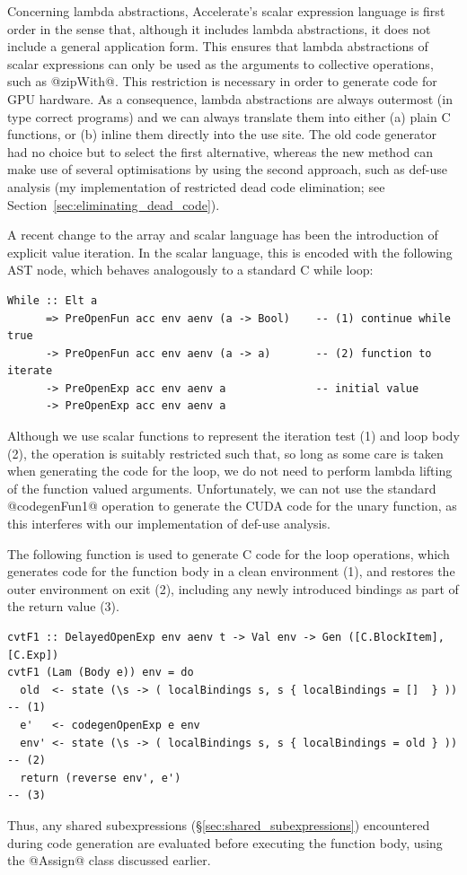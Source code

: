 Concerning lambda abstractions, Accelerate's scalar
expression language is first order in the sense that, although it includes
lambda abstractions, it does not include a general application form. This
ensures that lambda abstractions of scalar expressions can only be used as the
arguments to collective operations, such as @zipWith@. This restriction is
necessary in order to generate code for GPU hardware. As a consequence, lambda
abstractions are always outermost (in type correct programs) and we can always
translate them into either (a) plain C functions, or (b) inline them directly
into the use site. The old code generator had no choice but to select the first
alternative, whereas the new method can make use of several optimisations by
using the second approach, such as def-use analysis (my implementation of
restricted dead code elimination; see Section~\ref{sec:eliminating_dead_code}).

A recent change to the array and scalar language has been the introduction of
explicit value iteration. In the scalar language, this is encoded with the
following AST node, which behaves analogously to a standard C while loop:
%
\begin{lstlisting}[style=haskell]
While :: Elt a
      => PreOpenFun acc env aenv (a -> Bool)    -- (1) continue while true
      -> PreOpenFun acc env aenv (a -> a)       -- (2) function to iterate
      -> PreOpenExp acc env aenv a              -- initial value
      -> PreOpenExp acc env aenv a
\end{lstlisting}
%
Although we use scalar functions to represent the iteration test (1) and loop
body (2), the operation is suitably restricted such that, so long as some care is
taken when generating the code for the loop, we do not need to perform lambda
lifting of the function valued arguments. Unfortunately, we can not use the
standard @codegenFun1@ operation to generate the CUDA code for the unary
function, as this interferes with our implementation of def-use analysis.

The following function is used to generate C code for the loop operations, which
generates code for the function body in a clean environment (1), and restores
the outer environment on exit (2), including any newly introduced bindings as
part of the return value (3).
%
\begin{lstlisting}[style=haskell]
cvtF1 :: DelayedOpenExp env aenv t -> Val env -> Gen ([C.BlockItem], [C.Exp])
cvtF1 (Lam (Body e)) env = do
  old  <- state (\s -> ( localBindings s, s { localBindings = []  } ))             -- (1)
  e'   <- codegenOpenExp e env
  env' <- state (\s -> ( localBindings s, s { localBindings = old } ))             -- (2)
  return (reverse env', e')                                                        -- (3)
\end{lstlisting}
%
Thus, any shared subexpressions (\S\ref{sec:shared_subexpressions}) encountered
during code generation are evaluated before executing the function body, using
the @Assign@ class discussed earlier.


